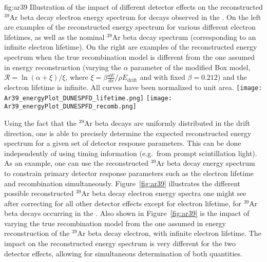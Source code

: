 \begin{dunefigure}{fig:ar39}
{Illustration of the impact of different detector effects on the reconstructed ${}^{39}$Ar  beta decay electron energy spectrum for decays observed in the .  On the left are examples of the reconstructed energy spectrum for various different electron lifetimes, as well as the nominal ${}^{39}$Ar  beta decay spectrum (corresponding to an infinite electron lifetime).  On the right are examples of the reconstructed energy spectrum when the true recombination model is different from the one assumed in energy reconstruction (varying the $\alpha$ parameter of the modified Box model, $\mathcal{R} = \ln(\alpha + \xi)/\xi$, where $\xi = \beta\frac{dE}{dx}/{\rho}E_{\mathrm{drift}}$ and with fixed $\beta = 0.212$) and the electron lifetime is infinite.  All curves have been normalized to unit area.}
\texttt{[image: Ar39\_energyPlot\_DUNESPFD\_lifetime.png]}
\texttt{[image: Ar39\_energyPlot\_DUNESPFD\_recomb.png]}
\end{dunefigure}

Using the fact that the ${}^{39}$Ar beta decays are uniformly distributed in the drift direction, one is able to precisely determine the expected reconstructed energy spectrum for a given set of detector response parameters. This can be done independently of using timing information (e.g.~from prompt scintillation light). As an example, one can use the reconstructed ${}^{39}$Ar beta decay energy spectrum to constrain primary detector response parameters such as the electron lifetime and recombination simultaneously. Figure~\ref{fig:ar39} illustrates the different possible reconstructed ${}^{39}$Ar beta decay electron energy spectra one might see after correcting for all other detector effects except for electron lifetime, for ${}^{39}$Ar beta decays occurring in the . Also shown in Figure~\ref{fig:ar39} is the impact of varying the true recombination model from the one assumed in energy reconstruction of the ${}^{39}$Ar beta decay electron, with infinite electron lifetime. The impact on the reconstructed energy spectrum is very different for the two detector effects, allowing for simultaneous determination of both quantities.

